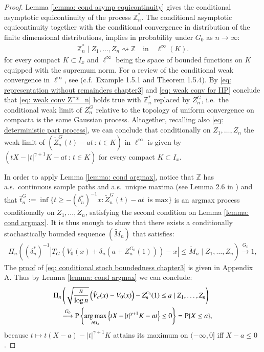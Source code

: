 \begin{proof}
Lemma \ref{lemma: cond asymp equicontinuity} gives the conditional asymptotic equicontinuity of the process $\mathbb{Z}^*_n$. The conditional asymptotic equicontinuity together with the conditional convergence in distribution of the finite dimensional distributions, implies in probability under $G_0$ as $n \rightarrow \infty$:
\begin{align}\label{eq: weak conv Z^*_n}
	\mathbb{Z}^*_n \mid Z_1,\ldots, Z_n \rightsquigarrow \mathbb{Z} \quad \text{in} \quad \ell^{\infty}(K).
\end{align}
for every compact $K \subset I_x$ and $\ell^{\infty}$ being the space of bounded functions on $K$ equipped with the supremum norm. For a review of the conditional weak convergence in $\ell^{\infty}$, see \cite{5} (c.f.\ Example 1.5.1 and Theorem 1.5.4). By \eqref{eq: representation without remainders chapter3} and \eqref{eq: weak conv for IIP} conclude that \eqref{eq: weak conv Z^*_n} holds true with $\mathbb{Z}^*_n $ replaced by $Z^{\scriptscriptstyle{G}}_n$, i.e.\ the conditional weak limit of $Z^{\scriptscriptstyle{G}}_n$ relative to the topology of uniform convergence on compacta is the same Gaussian process. Altogether, recalling also \eqref{eq: deterministic part process}, we can conclude that conditionally on $Z_1,\ldots, Z_n$ the weak limit of $(\tilde{Z}_n^{\scriptscriptstyle{G}}(t) - at \, : \, t \in K )$ in $\ell^{\infty}$ is given by $( tX - |t|^{\gamma+1} K - at \, : \, t \in K )$ for every compact $K\subset I_x$.

In order to apply Lemma \ref{lemma: cond argmax}, notice that \( \mathbb{Z}\) has a.s.\ continuous sample paths and a.s.\ unique maxima (see Lemma 2.6 in \cite{12}) and that $\hat{t}^{\scriptscriptstyle{G}}_n :=  \inf \big\{t \geq-(\delta^*_n)^{-1} x: \tilde{Z}^{\scriptscriptstyle{G}}_n(t)-a t \, \text { is max}\big\}$ is an argmax process conditionally on $Z_1, \ldots, Z_n$, satisfying the second condition on Lemma \ref{lemma: cond argmax}. It is thus enough to show that there exists a conditionally stochastically bounded sequence \((\tilde{M}_n)\) that satisfies:
\begin{align}\label{eq: conditional stoch boundedness chapter3}
\Pi_n \left( \left( \delta_n^* \right)^{-1} \left| T_{\scriptscriptstyle{G}} \left( V_0(x) + \delta_n (a + Z^{\scriptscriptstyle{G_0}}_n(1)) \right) - x \right| \leq \tilde{M}_n \mid Z_1, \ldots, Z_n \right) 
\stackrel{G_0}{\to} 1,
\end{align}
The \hyperlink{proof of stoch boundedness}{proof} of \eqref{eq: conditional stoch boundedness chapter3} is given in Appendix A. Thus by Lemma \ref{lemma: cond argmax} we can conclude:
\begin{align*}
&\Pi_n\left( \sqrt{\frac{n}{\log n}}\left(\hat{V}_{\scriptscriptstyle{G}}(x)-V_0(x)\right) -Z^{\scriptscriptstyle{G_0}}_n(1) \leq a \mid Z_1, \ldots, Z_n \right)  \\
& \quad \stackrel{G_0}{\longrightarrow} \mathrm{P} \left\{ \underset{t \in I_x}{\arg \max }\left\{t X-|t|^{\gamma+ 1}  K  -a t \right\} \leq 0 \right\} = \mathrm{P}\{ X \leq a\},
\end{align*}
because $t \mapsto t(X-a) - |t|^{\gamma +1}K$ attains its maximum on $(-\infty,0]$ iff $X-a\leq 0$.
\end{proof}

